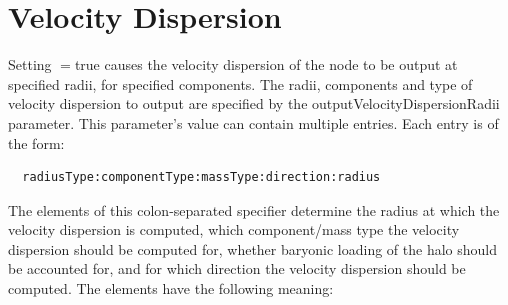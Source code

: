 \section{Velocity Dispersion}

Setting {\normalfont \ttfamily [outputVelocityDispersionData]}$=${\normalfont \ttfamily true} causes the velocity dispersion of the node to be output at specified radii, for specified components. The radii, components and type of velocity dispersion to output are specified by the {\normalfont \ttfamily outputVelocityDispersionRadii} parameter. This parameter's value can contain multiple entries. Each entry is of the form:
\begin{verbatim}
  radiusType:componentType:massType:direction:radius
\end{verbatim}
The elements of this colon-separated specifier determine the radius at which the velocity dispersion is computed, which component/mass type the velocity dispersion should be computed for, whether baryonic loading of the halo should be accounted for, and for which direction the velocity dispersion should be computed. The elements have the following meaning:
